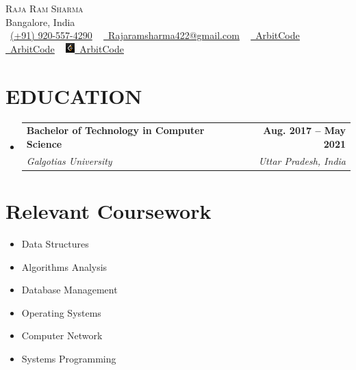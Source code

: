 \documentclass[letterpaper,11pt]{article}
\makeatletter
\newcommand{\resumeSubheading}[4]{
  \vspace{-2pt}\item
    \begin{tabular*}{1.0\textwidth}[t]{l@{\extracolsep{\fill}}r}
      \textbf{#1} & \textbf{\small #2} \\
      \textit{\small#3} & \textit{\small #4} \\
    \end{tabular*}\vspace{-7pt}
}
\newcommand{\resumeSubHeadingListStart}{\begin{itemize}[leftmargin=0.0in, label={}]}
\newcommand{\resumeSubHeadingListEnd}{\end{itemize}}
\makeatother
\begin{document}

\begin{center}
    {\Huge \scshape Raja Ram Sharma} \\ \vspace{1pt}
    Bangalore, India \\ \vspace{1pt}
    \small \raisebox{-0.1\height}\faPhone\ \href{tel:+919205574290}{(+91) 920-557-4290}
    ~ \href{mailto:Rajaramsharma422@gmail.com}{\raisebox{-0.2\height}\faEnvelope\  \underline{Rajaramsharma422@gmail.com}}
    ~ \href{https://linkedin.com/in/ArbitCode}{\raisebox{-0.2\height}\faLinkedin\ \underline{ArbitCode}}
    ~ \href{https://github.com/ArbitCode}{\raisebox{-0.2\height}\faGithub\ \underline{ArbitCode}}
    ~ \href{https://leetcode.com/ArbitCode}{\textbf{\includegraphics[height=10pt, width=10pt]{./img/leetcode.png}}\ \underline{ArbitCode}}
    \vspace{-8pt}
\end{center}


\section{EDUCATION}
  \resumeSubHeadingListStart
    \resumeSubheading
      {Bachelor of Technology in Computer Science}{Aug. 2017 -- May 2021}
      {Galgotias University}{Uttar Pradesh, India}
  \resumeSubHeadingListEnd

 \section{Relevant Coursework}
         \begin{multicols}{3}
             \begin{itemize}[itemsep=-5pt, parsep=3pt]
                 \item Data Structures
                 \item Algorithms Analysis
                 \item Database Management
                 \item Operating Systems
                 \item Computer Network
                 \item Systems Programming
             \end{itemize}
        \end{multicols}
\end{document}
